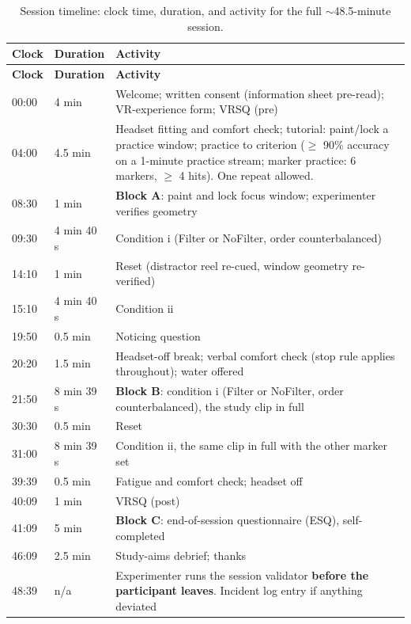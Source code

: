 \begin{longtable}{p{}|p{}|p{}}
\caption{Session timeline: clock time, duration, and activity for the full $\sim$48.5-minute session.}\\
\hline
\textbf{Clock} & \textbf{Duration} & \textbf{Activity} \\
\hline
\endfirsthead
\hline
\textbf{Clock} & \textbf{Duration} & \textbf{Activity} \\
\hline
\endhead
\hline
00:00 & 4 min & Welcome; written consent (information sheet pre-read); VR-experience form; VRSQ (pre) \\
04:00 & 4.5 min & Headset fitting and comfort check; tutorial: paint/lock a practice window; practice to criterion ($\geq$ 90\% accuracy on a 1-minute practice stream; marker practice: 6 markers, $\geq$ 4 hits). One repeat allowed. \\
08:30 & 1 min & \textbf{Block A}: paint and lock focus window; experimenter verifies geometry \\
09:30 & 4 min 40 s & Condition i (Filter or NoFilter, order counterbalanced) \\
14:10 & 1 min & Reset (distractor reel re-cued, window geometry re-verified) \\
15:10 & 4 min 40 s & Condition ii \\
19:50 & 0.5 min & Noticing question \\
20:20 & 1.5 min & Headset-off break; verbal comfort check (stop rule applies throughout); water offered \\
21:50 & 8 min 39 s & \textbf{Block B}: condition i (Filter or NoFilter, order counterbalanced), the study clip in full \\
30:30 & 0.5 min & Reset \\
31:00 & 8 min 39 s & Condition ii, the same clip in full with the other marker set \\
39:39 & 0.5 min & Fatigue and comfort check; headset off \\
40:09 & 1 min & VRSQ (post) \\
41:09 & 5 min & \textbf{Block C}: end-of-session questionnaire (ESQ), self-completed \\
46:09 & 2.5 min & Study-aims debrief; thanks \\
48:39 & n/a & Experimenter runs the session validator \textbf{before the participant leaves}. Incident log entry if anything deviated \\
\hline
\end{longtable}

